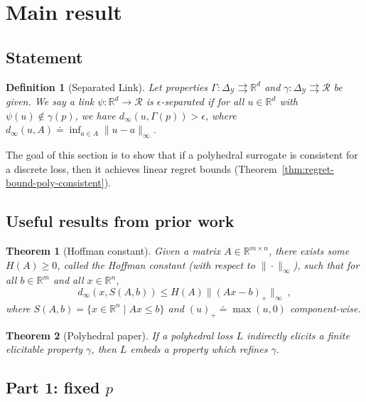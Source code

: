 \documentclass[12pt]{article}
\newcommand{\reals}{\mathbb{R}}
\newcommand{\defeq}{\doteq}%
\newcommand{\simplex}{\Delta_\Y}
\newcommand{\R}{\mathcal{R}}
\newcommand{\Y}{\mathcal{Y}}
\newcommand{\toto}{\rightrightarrows}
\newtheorem{theorem}{Theorem}
\newtheorem{definition}{Definition}
\begin{document}
\section{Main result}

\subsection{Statement}

\begin{definition}[Separated Link]\label{def:sep-link}
  Let properties $\Gamma:\simplex\toto\reals^d$ and $\gamma:\simplex\toto\R$ be given.
  We say a link $\psi:\reals^d\to\R$
  is \emph{$\epsilon$-separated} if for all $u\in\reals^d$ with $\psi(u)\notin\gamma(p)$, we have $d_\infty(u,\Gamma(p)) > \epsilon$, where $d_\infty(u,A) \defeq \inf_{a\in A} \|u-a\|_\infty$.
\end{definition}

The goal of this section is to show that if a polyhedral surrogate is consistent for a discrete loss, then it achieves linear regret bounds (Theorem~\ref{thm:regret-bound-poly-consistent}).

\subsection{Useful results from prior work}

\begin{theorem}[Hoffman constant]
  \label{thm:hoffman}
  Given a matrix $A\in\reals^{m\times n}$, there exists some $H(A)\geq 0$, called the \emph{Hoffman constant} (with respect to $\|\cdot\|_\infty$), such that for all $b\in\reals^m$ and all $x\in\reals^n$,
  \begin{equation}
    \label{eq:hoffman}
    d_\infty(x,S(A,b)) \leq H(A) \|(A x - b)_+\|_\infty~,
  \end{equation}
  where $S(A,b) = \{x\in\reals^n \mid A x \leq b\}$ and $(u)_+ \defeq \max(u,0)$ component-wise.
\end{theorem}

\begin{theorem}[Polyhedral paper]
  \label{thm:poly-embed-refine}
  If a polyhedral loss $L$ indirectly elicits a finite elicitable property $\gamma$, then $L$ embeds a property which refines $\gamma$.
\end{theorem}

\subsection{Part 1: fixed $p$}
\end{document}
